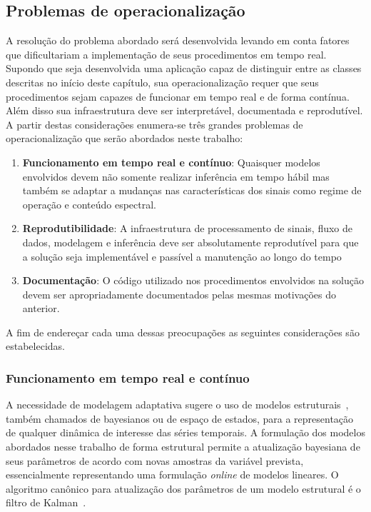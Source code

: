 \subsection{Problemas de operacionalização}

A resolução do problema abordado será desenvolvida levando em conta fatores que
dificultariam a implementação de seus procedimentos em tempo real. Supondo que
seja desenvolvida uma aplicação capaz de distinguir entre as classes descritas
no início deste capítulo, sua operacionalização requer que seus procedimentos
sejam capazes de funcionar em tempo real e de forma contínua. Além disso sua
infraestrutura deve ser interpretável, documentada e reprodutível. A partir
destas considerações enumera-se três grandes problemas de operacionalização
que serão abordados neste trabalho:

\begin{enumerate}
    \item \textbf{Funcionamento em tempo real e contínuo}: Quaisquer modelos
    envolvidos devem não somente realizar inferência em tempo hábil mas também
    se adaptar a mudanças nas características dos sinais como regime de
    operação e conteúdo espectral.
    \item \textbf{Reprodutibilidade}: A infraestrutura de processamento de
    sinais, fluxo de dados, modelagem e inferência deve ser absolutamente
    reprodutível para que a solução seja implementável e passível a manutenção
    ao longo do tempo
    \item \textbf{Documentação}: O código utilizado nos procedimentos
    envolvidos na solução devem ser apropriadamente documentados pelas mesmas
    motivações do anterior.
\end{enumerate}

A fim de endereçar cada uma dessas preocupações as seguintes considerações são
estabelecidas.

\subsubsection{Funcionamento em tempo real e contínuo}

A necessidade de modelagem adaptativa sugere o uso de modelos
estruturais~\cite{structural}, também chamados de bayesianos ou de espaço de
estados, para a representação de qualquer dinâmica de interesse das séries
temporais. A formulação dos modelos abordados nesse trabalho de forma
estrutural permite a atualização bayesiana de seus parâmetros de acordo com
novas amostras da variável prevista, essencialmente representando uma
formulação \emph{online} de modelos lineares. O algoritmo canônico para
atualização dos parâmetros de um modelo estrutural é o filtro de
Kalman~\cite{kalman}.

